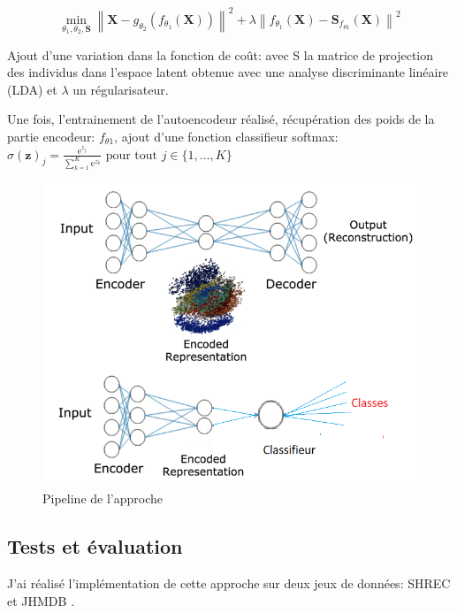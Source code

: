 $$\min _{\theta_{1}, \theta_{2}, \mathbf{S}}\left\|\mathbf{X}-g_{\theta_{2}}\left(f_{\theta_{1}}(\mathbf{X})\right)\right\|^{2}+\lambda\left\|f_{\theta_{1}}(\mathbf{X})-\mathbf{S}_{f_{\theta 1}}(\mathbf{X})\right\|^{2}$$

Ajout d'une variation dans la fonction de coût: avec S la matrice de projection des individus dans l'espace latent obtenue avec une analyse discriminante linéaire (LDA) et $\lambda$ un régularisateur.

Une fois, l'entrainement de l'autoencodeur réalisé, récupération des poids de la partie encodeur: $f_{\theta 1}$, ajout d'une fonction classifieur softmax:\\ 

$\sigma(\mathbf{z})_{j}=\frac{\mathrm{e}^{z_{j}}}{\sum_{k=1}^{K} \mathrm{e}^{z_{k}}} \text { pour  tout } j \in\{1, \ldots, K\}$


\begin{figure}[H]
    \centering
    \includegraphics[width=0.8\linewidth]{Images/Autoencoder_modif.png}
    \caption{Pipeline de l'approche}
    \label{fig:AEmodif}
\end{figure}

\subsection{Tests et évaluation}
J'ai réalisé l'implémentation de cette approche sur deux jeux de données: SHREC \cite{de2017shrec} et JHMDB \cite{jhuang2013towards}.\\

